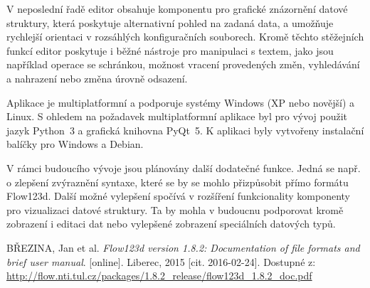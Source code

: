 \documentclass[FM,bw,DP]{tulthesis}
\begin{document}
V neposlední řadě editor obsahuje komponentu pro grafické znázornění datové struktury, která poskytuje alternativní pohled na zadaná data, a umožňuje rychlejší orientaci v rozsáhlých konfiguračních souborech. Kromě těchto stěžejních funkcí editor poskytuje i běžné nástroje pro manipulaci s textem, jako jsou například operace se schránkou, možnost vracení provedených změn, vyhledávání a nahrazení nebo změna úrovně odsazení.

Aplikace je multiplatformní a podporuje systémy Windows (XP nebo novější) a Linux. S ohledem na požadavek multiplatformní aplikace byl pro vývoj použit jazyk Python~3 a grafická knihovna PyQt~5. K aplikaci byly vytvořeny instalační balíčky pro Windows a Debian.

V rámci budoucího vývoje jsou plánovány další dodatečné funkce. Jedná se např. o zlepšení zvýraznění syntaxe, které se by se mohlo přizpůsobit přímo formátu Flow123d. Další možné vylepšení spočívá v rozšíření funkcionality komponenty pro vizualizaci datové struktury. Ta by mohla v budoucnu podporovat kromě zobrazení i editaci dat nebo vylepšené zobrazení speciálních datových typů.

\begin{thebibliography}{9}


BŘEZINA, Jan et al. \textit{Flow123d version 1.8.2: Documentation of file formats and brief user manual}. [online]. Liberec, 2015 [cit. 2016-02-24]. Dostupné z: \url{http://flow.nti.tul.cz/packages/1.8.2_release/flow123d_1.8.2_doc.pdf}
	
\end{thebibliography}
\end{document}
